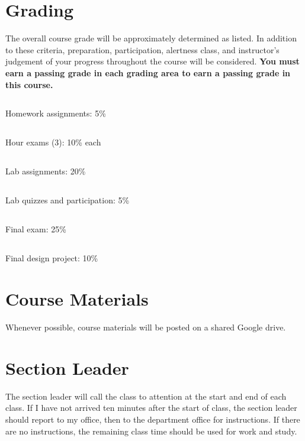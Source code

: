 \documentclass[11pt,courier]{navymemo}
\begin{document}
\section{Grading} The overall course grade will be approximately determined as listed. In addition to these criteria, preparation, participation, alertness class, and instructor's judgement of your progress throughout the course will be considered. \textbf{You must earn a passing grade in each grading area to earn a passing grade in this course.}
\subsection{} Homework assignments: 5\%
\subsection{} Hour exams (3): 10\% each
\subsection{} Lab assignments: 20\%
\subsection{} Lab quizzes and participation: 5\%
\subsection{} Final exam: 25\%
\subsection{} Final design project: 10\%

\section{Course Materials} Whenever possible, course materials will be posted on a shared Google drive. 

\section{Section Leader} The section leader will call the class to attention at the start and end of each class. If I have not arrived ten minutes after the start of class, the section leader should report to my office, then to the department office for instructions. If there are no instructions, the remaining class time should be used for work and study. 
\end{document}
